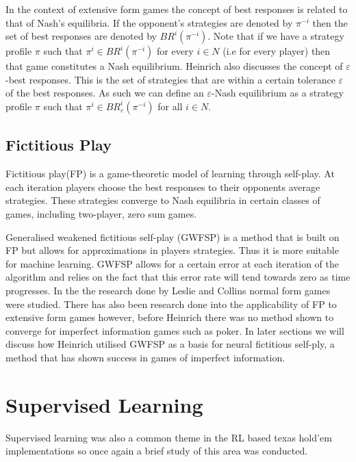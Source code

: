 In the context of extensive form games the concept of best responses is related to that of Nash's equilibria.
If the opponent's strategies are denoted by $\pi^{-i}$ then the set of best responses are denoted by
$BR^i(\pi^{-i})$.
Note that if we have a strategy profile $\pi$ such that $\pi^i\in BR^i(\pi^{-i})$ for every $i\in N$ (i.e
for every player) then that game constitutes a Nash equilibrium\citep{heinrich2017reinforcement}.
Heinrich also discusses the concept of $\varepsilon$-best responses.
This is the set of strategies that are within a certain tolerance $\varepsilon$ of the best responses.
As such we can define an $\varepsilon$-Nash equilibrium as a strategy profile $\pi$ such that
$\pi^i \in BR^i_\varepsilon (\pi^{-i})$ for all $i\in N$.

\subsection{Fictitious Play}\label{subsec:fictitiousPlay}
Fictitious play(FP) is a game-theoretic model of learning through self-play.
At each iteration players choose the best responses to their opponents average
strategies\citep{heinrich2017reinforcement}.
These strategies converge to Nash equilibria in certain classes of games, including two-player, zero sum games.

Generalised weakened fictitious self-play (GWFSP) is a method that is built on FP but allows for approximations
in players strategies\citep{leslie2006generalised}.
Thus it is more suitable for machine learning.
GWFSP allows for a certain error at each iteration of the algorithm and relies on the fact that this
error rate will tend towards zero as time progresses.
In the the research done by Leslie and Collins normal form games were studied.
There has also been research done into the applicability of FP to extensive form games however,
before Heinrich there was no method shown to converge for imperfect information games such as poker.
In later sections we will discuss how Heinrich utilised GWFSP as a basis for neural fictitious self-ply,
a method that has shown success in games of imperfect information.

\section{Supervised Learning}\label{sec:supervisedLearning}
Supervised learning was also a common theme in the RL based texas hold'em implementations so once again a
brief study of this area was conducted.

